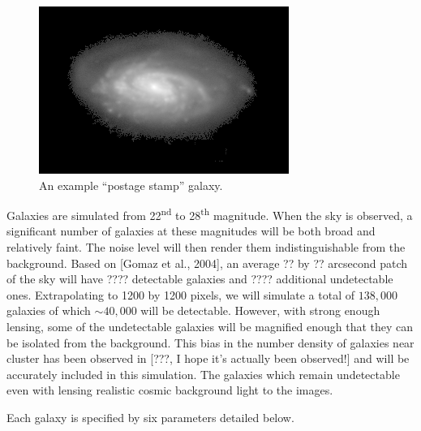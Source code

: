 \documentclass[10pt,twoside]{article}
\theoremstyle{definition}
\theoremstyle{exercise}
\begin{document}
\begin{figure}
  \begin{center}
    \includegraphics[scale=10]{images/example_galaxy.png}
  \end{center}
  \caption{An example ``postage stamp'' galaxy.}
  \label{fig:postage_stamp}
\end{figure}


Galaxies are simulated from 22\textsuperscript{nd} to 28\textsuperscript{th} magnitude. When the sky is observed, a significant number of galaxies at these magnitudes will be both broad and relatively faint. The noise level will then render them indistinguishable from the background. Based on [Gomaz et al., 2004], an average ?? by ?? arcsecond patch of the sky will have ???? detectable galaxies and ???? additional undetectable ones. Extrapolating to 1200 by 1200 pixels, we will simulate a total of $138,000$ galaxies of which $\sim40,000$ will be detectable. However, with strong enough lensing, some of the undetectable galaxies will be magnified enough that they can be isolated from the background. This bias in the number density of galaxies near cluster has been observed in [???, I hope it's actually been observed!] and will be accurately included in this simulation. The galaxies which remain undetectable even with lensing realistic cosmic background light to the images.

Each galaxy is specified by six parameters detailed below.
\end{document}
